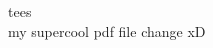 \documentclass[12pt,a4paper,oneside,dvipsnames]{article}
\begin{document}
tees\\
my supercool pdf file change xD

\end{document}
